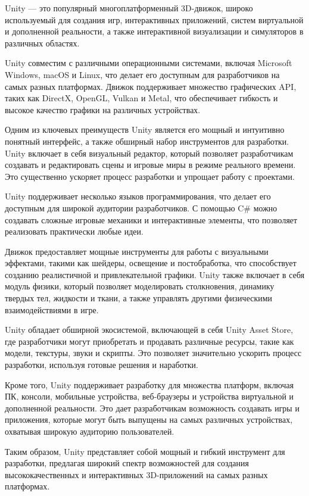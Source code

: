 \documentclass[a4paper,12pt]{article}
\begin{document}
	Unity — это популярный многоплатформенный 3D-движок, широко используемый для создания игр, интерактивных приложений, систем виртуальной и дополненной реальности, а также интерактивной визуализации и симуляторов в различных областях.
	
	Unity совместим с различными операционными системами, включая Microsoft Windows, macOS и Linux, что делает его доступным для разработчиков на самых разных платформах. Движок поддерживает множество графических API, таких как DirectX, OpenGL, Vulkan и Metal, что обеспечивает гибкость и высокое качество графики на различных устройствах.
	
	Одним из ключевых преимуществ Unity является его мощный и интуитивно понятный интерфейс, а также обширный набор инструментов для разработки. Unity включает в себя визуальный редактор, который позволяет разработчикам создавать и редактировать сцены и игровые миры в режиме реального времени. Это существенно ускоряет процесс разработки и упрощает работу с проектами.
	
	Unity поддерживает несколько языков программирования, что делает его доступным для широкой аудитории разработчиков. С помощью C\# можно создавать сложные игровые механики и интерактивные элементы, что позволяет реализовать практически любые идеи.
	
	Движок предоставляет мощные инструменты для работы с визуальными эффектами, такими как шейдеры, освещение и постобработка, что способствует созданию реалистичной и привлекательной графики. Unity также включает в себя модуль физики, который позволяет моделировать столкновения, динамику твердых тел, жидкости и ткани, а также управлять другими физическими взаимодействиями в игре.
	
	Unity обладает обширной экосистемой, включающей в себя Unity Asset Store, где разработчики могут приобретать и продавать различные ресурсы, такие как модели, текстуры, звуки и скрипты. Это позволяет значительно ускорить процесс разработки, используя готовые решения и наработки.
	
	Кроме того, Unity поддерживает разработку для множества платформ, включая ПК, консоли, мобильные устройства, веб-браузеры и устройства виртуальной и дополненной реальности. Это дает разработчикам возможность создавать игры и приложения, которые могут быть выпущены на самых различных устройствах, охватывая широкую аудиторию пользователей.
	
	Таким образом, Unity представляет собой мощный и гибкий инструмент для разработки, предлагая широкий спектр возможностей для создания высококачественных и интерактивных 3D-приложений на самых разных платформах.
	
\end{document}
